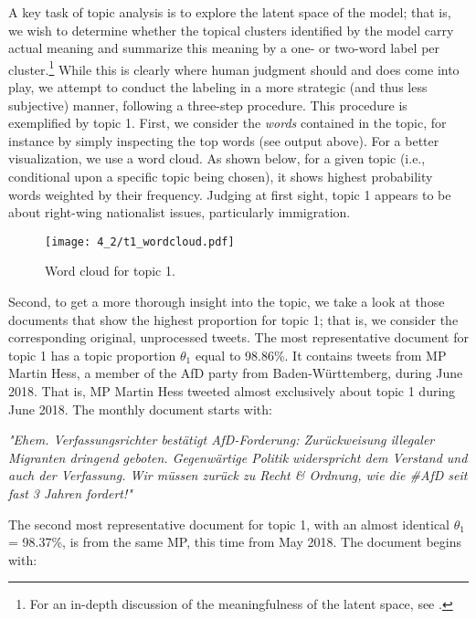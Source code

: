 \documentclass[12pt]{article}
\begin{document}
A key task of topic analysis is to explore the latent space of the model; that is, we wish to determine whether the topical clusters identified by the model carry actual meaning and summarize this meaning by a one- or two-word label per cluster.\footnote{For an in-depth discussion of the meaningfulness of the latent space, see \cite{chang2009reading}.} While this is clearly where human judgment should and does come into play, we attempt to conduct the labeling in a more strategic (and thus less subjective) manner, following a three-step procedure. This procedure is exemplified by topic 1. First, we consider the \textit{words} contained in the topic, for instance by simply inspecting the top words (see output above). For a better visualization, we use a word cloud. As shown below, for a given topic (i.e., conditional upon a specific topic being chosen), it shows highest probability words weighted by their frequency. Judging at first sight, topic 1 appears to be about right-wing nationalist issues, particularly immigration.

\begin{figure}[h!]
  \centering
  \captionsetup{justification=centering,margin=2cm}
  \texttt{[image: 4\_2/t1\_wordcloud.pdf]}
  \caption{Word cloud for topic 1.}
  \label{fig:t1_wordcloud}
\end{figure}

Second, to get a more thorough insight into the topic, we take a look at those documents that show the highest proportion for topic 1; that is, we consider the corresponding original, unprocessed tweets. The most representative document for topic 1 has a topic proportion $\theta_1$ equal to 98.86\%. It contains tweets from MP Martin Hess, a member of the AfD party from Baden-Württemberg, during June 2018. That is, MP Martin Hess tweeted almost exclusively about topic 1 during June 2018. The monthly document starts with:

\vspace{0.5cm}
\noindent
\textit{"Ehem. Verfassungsrichter bestätigt AfD-Forderung: Zurückweisung illegaler Migranten dringend geboten. Gegenwärtige Politik widerspricht dem Verstand und auch der Verfassung. Wir müssen zurück zu Recht \& Ordnung, wie die \#AfD seit fast 3 Jahren fordert!"}
\vspace{0.5cm}

The second most representative document for topic 1, with an almost identical $\theta_1$ = 98.37\%, is from the same MP, this time from May 2018. The document begins with:
\end{document}
